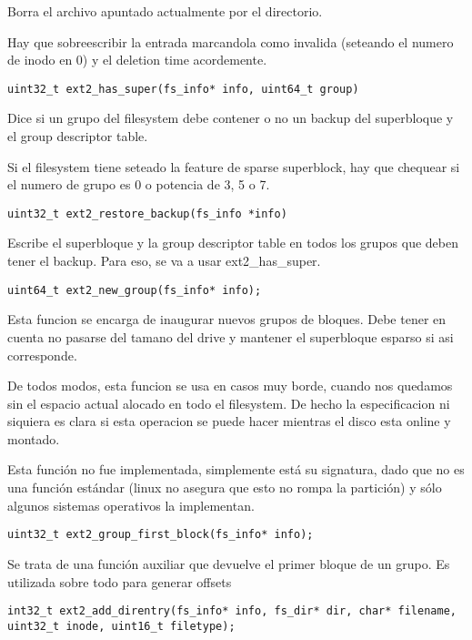 Borra el archivo apuntado actualmente por el directorio.

Hay que sobreescribir la entrada marcandola como invalida (seteando el numero de inodo en 0) y el deletion time acordemente. 


\begin{lstlisting}[style=customc]
uint32_t ext2_has_super(fs_info* info, uint64_t group)
\end{lstlisting}

Dice si un grupo del filesystem debe contener o no un backup del superbloque y el group descriptor table.

Si el filesystem tiene seteado la feature de sparse superblock, hay que chequear si el numero de grupo es 0 o potencia de 3, 5 o 7.


\begin{lstlisting}[style=customc]
uint32_t ext2_restore_backup(fs_info *info)
\end{lstlisting}

Escribe el superbloque y la group descriptor table en todos los grupos que deben tener el backup. Para eso, se va a usar ext2\_has\_super.


\begin{lstlisting}[style=customc]
uint64_t ext2_new_group(fs_info* info);
\end{lstlisting}
Esta funcion se encarga de inaugurar nuevos grupos de bloques. Debe tener en cuenta no pasarse del tamano del drive y mantener el superbloque esparso si asi corresponde.

De todos modos, esta funcion se usa en casos muy borde, cuando nos quedamos sin el espacio actual alocado en todo el filesystem. De hecho la especificacion ni siquiera es clara si esta operacion se puede hacer mientras el disco esta online y montado.

Esta función no fue implementada, simplemente está su signatura, dado que no es una función estándar (linux no asegura que esto no rompa la partición) y sólo algunos sistemas operativos la implementan.



\begin{lstlisting}[style=customc]
uint32_t ext2_group_first_block(fs_info* info);
\end{lstlisting}

Se trata de una función auxiliar que devuelve el primer bloque de un grupo. Es utilizada sobre todo para generar offsets

\begin{lstlisting}[style=customc]
int32_t ext2_add_direntry(fs_info* info, fs_dir* dir, char* filename, uint32_t inode, uint16_t filetype);
\end{lstlisting}

